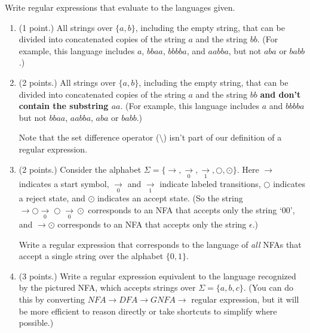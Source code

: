 \documentclass[letterpaper,11pt,twoside]{article}
\theoremstyle{plain}
\theoremstyle{definition}
\theoremstyle{remark}
\theoremstyle{restate}
\begin{document}
Write regular expressions that evaluate to the languages given.
\begin{enumerate}[resume]
    \item (1 point.) All strings over $\{a, b\}$, including the empty string, that can be divided into concatenated copies of the string $a$ and the string $bb$. (For example, this language includes $a$, $bbaa$, $bbbba$, and $aabba$, but not $aba$ or $babb$.)
    
    \item (2 points.) All strings over $\{a, b\}$, including the empty string, that can be divided into concatenated copies of the string $a$ and the string $bb$ \textbf{and don't contain the substring $aa$}. (For example, this language includes $a$ and $bbbba$ but not $bbaa$, $aabba$, $aba$ or $babb$.)
    
    Note that the set difference operator ($\setminus$) isn't part of our definition of a regular expression.

    \item (2 points.) Consider the alphabet $\Sigma = \{\rightarrow, \underset{0}{\rightarrow}, \underset{1}{\rightarrow}, \bigcirc, \odot\}$. Here $\rightarrow$ indicates a start symbol, $\underset{0}{\rightarrow}$ and $\underset{1}{\rightarrow}$ indicate labeled transitions, $\bigcirc$ indicates a reject state, and $\odot$ indicates an accept state. (So the string $\rightarrow \bigcirc \underset{0}{\rightarrow} \bigcirc \underset{0}{\rightarrow} \odot$ corresponds to an NFA that accepts only the string `00', and $\rightarrow \odot$ corresponds to an NFA that accepts only the string $\epsilon$.)
    
    Write a regular expression that corresponds to the language of \emph{all} NFAs that accept a single string over the alphabet $\{0, 1\}$.
    
    \item (3 points.) Write a regular expression equivalent to the language recognized by the pictured NFA, which accepts strings over $\Sigma = \{a, b, c\}$. (You can do this by converting $NFA \rightarrow DFA \rightarrow GNFA \rightarrow $ regular expression, but it will be more efficient to reason directly or take shortcuts to simplify where possible.)
    

\end{enumerate}
\end{document}
